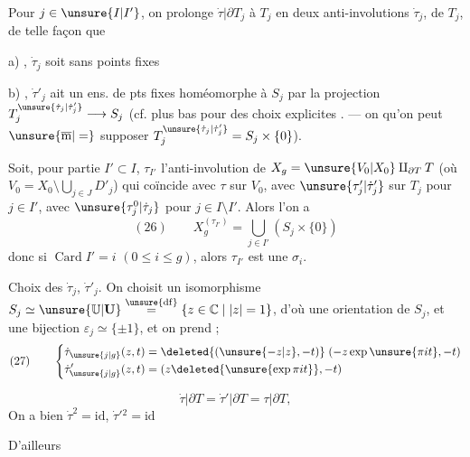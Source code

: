 Pour  $j\in\unsure{I|I'}$, on prolonge $\dot\tau|\partial T_j$ à $T_j$ en deux anti-involutions $\dot\tau_j$,  de $T_j$,   de telle façon que


a) , $\dot\tau_j$ soit sans points fixes

b) , $\dot\tau'_j$ ait un ens. de pts fixes homéomorphe à $S_j$ par la projection $T_j^{\unsure{\dot\tau_j|\dot\tau'_j}}\longrightarrow S_j$ (cf. plus bas \unsure{\}} pour des choix   explicites \unsure{\}}. --- on  qu'on peut $\unsure{\overline{\mathrm m}|=}$ supposer $T_j^{\unsure{\dot\tau_j|\dot\tau'_j}}=S_j\times\{0\}$).

Soit, pour  partie $I'\subset I$, $\tau_{I'}$ l'anti-involution de $X_g=\unsure{V_0|X_0}\amalg_{\partial T}T$ (où $V_0=X_0\setminus\bigcup_{j\in J}D'_j$) qui coïncide avec $\tau$ sur $V_0$, avec $\unsure{\tau'_j|\dot\tau'_j}$ sur $T_j$ pour $j\in I'$, avec $\unsure{\tau_j^0|\dot\tau_j}$ pour $j\in I\setminus I'$. Alors l'on a
\[
(26)\qquad X_g^{(\tau_{I'})}=\bigcup_{j\in I'}(S_j\times\{0\})
\]
donc si $\operatorname{Card}I'=i$ $(0\leq i\leq g)$, alors $\tau_{I'}$ est une $\sigma_i$.

Choix des $\dot\tau_j$, $\dot\tau'_j$. On choisit un isomorphisme $S_j\simeq\unsure{\mathbb U|\mathbf U}\overset{\unsure{\mathrm{df}}}{=}\{z\in\mathbb C\mid |z|=1\}$, d'où une orientation de $S_j$, et une bijection $\varepsilon_j\simeq\{\pm1\}$,  et on prend ;
\[
(27)\qquad
\left\{\begin{aligned}
\dot\tau_{\unsure{j|g}}(z,t)&=\deleted{(\unsure{-z|z},-t)}\;(-z\exp\unsure{\pi it},-t)\\
\dot\tau'_{\unsure{j|g}}(z,t)&=(z\deleted{\unsure{\exp\pi it}},-t)
\end{aligned}\right.
\]


\[
\dot\tau|\partial T=\dot\tau'|\partial T=\tau|\partial T,
\]
On a bien $\dot\tau^2=\mathrm{id}$, $\dot\tau'{}^2=\mathrm{id}$

D'ailleurs

